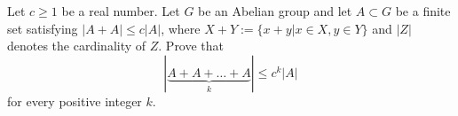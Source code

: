 Let \(c \ge 1\) be a real number. Let \(G\) be an Abelian group and let \(A \subset G\) be a finite set satisfying \(|A+A| \le c|A|\), where \(X+Y:= \{x+y| x \in X, y \in Y\}\) and \(|Z|\) denotes the cardinality of \(Z\). Prove that
\[|\underbrace{A+A+\dots+A}_k| \le c^k |A|\]
for every positive integer \(k\).

